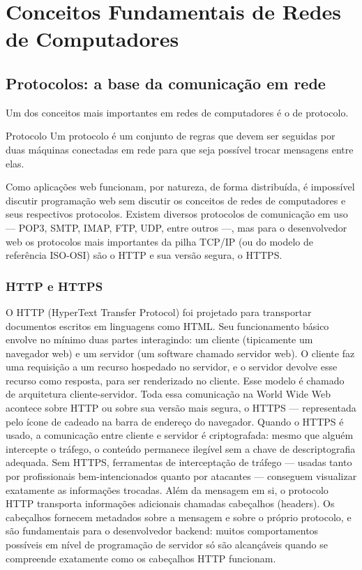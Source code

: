 \chapter{Conceitos Fundamentais de Redes de Computadores}

\section{Protocolos: a base da comunicação em rede}

Um dos conceitos mais importantes em redes de computadores é o de protocolo.

\begin{infobox}{Protocolo}
Um protocolo é um conjunto de regras que devem ser seguidas por duas máquinas conectadas em rede para que seja possível trocar mensagens entre elas.
\end{infobox}

Como aplicações web funcionam, por natureza, de forma distribuída, é impossível discutir programação web sem discutir os conceitos de redes de computadores e seus respectivos protocolos. Existem diversos protocolos de comunicação em uso — POP3, SMTP, IMAP, FTP, UDP, entre outros —, mas para o desenvolvedor web os protocolos mais importantes da pilha TCP/IP (ou do modelo de referência ISO-OSI) são o HTTP e sua versão segura, o HTTPS.

\subsection{HTTP e HTTPS}

O HTTP (HyperText Transfer Protocol) foi projetado para transportar documentos escritos em linguagens como HTML. Seu funcionamento básico envolve no mínimo duas partes interagindo: um cliente (tipicamente um navegador web) e um servidor (um software chamado servidor web). O cliente faz uma requisição a um recurso hospedado no servidor, e o servidor devolve esse recurso como resposta, para ser renderizado no cliente. Esse modelo é chamado de arquitetura cliente-servidor. Toda essa comunicação na World Wide Web acontece sobre HTTP ou sobre sua versão mais segura, o HTTPS — representada pelo ícone de cadeado na barra de endereço do navegador. Quando o HTTPS é usado, a comunicação entre cliente e servidor é criptografada: mesmo que alguém intercepte o tráfego, o conteúdo permanece ilegível sem a chave de descriptografia adequada. Sem HTTPS, ferramentas de interceptação de tráfego — usadas tanto por profissionais bem-intencionados quanto por atacantes — conseguem visualizar exatamente as informações trocadas. Além da mensagem em si, o protocolo HTTP transporta informações adicionais chamadas cabeçalhos (headers). Os cabeçalhos fornecem metadados sobre a mensagem e sobre o próprio protocolo, e são fundamentais para o desenvolvedor backend: muitos comportamentos possíveis em nível de programação de servidor só são alcançáveis quando se compreende exatamente como os cabeçalhos HTTP funcionam.

